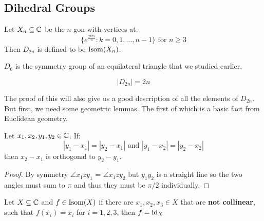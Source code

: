 \documentclass[../main.tex]{subfiles}
\begin{document}
\subsection{Dihedral Groups}
\begin{definition}
  Let $X_n \subseteq \mathbb{C}$ be the $n$-gon with vertices at:
  \[
    \{e^{\frac{2k\pi i}{n}}: k = 0, 1, \ldots, n-1\} \text{ for } n \geq3
  \]
  Then $D_{2n}$ is defined to be $\operatorname{Isom}(X_n)$.
\end{definition}
\begin{example}
  $D_6$ is the symmetry group of an equilateral triangle that we studied earlier.
\end{example}
\begin{theorem}
  \[
    |D_{2n}| = 2n
  \]
\end{theorem}
The proof of this will also give us a good description of all the elements of $D_{2n}$.
But first, we need some geometric lemmas.
The first of which is a basic fact from Euclidean geometry.
\begin{lemma}
  Let $x_1, x_2, y_1, y_2 \in \mathbb{C}$. If:
  \[
    |y_1 - x_1| = |y_2 - x_1| \text{ and } |y_1 - x_2| = |y_2 - x_2|
    \label{kiteLemma}
  \]
  then $x_2 - x_1$ is orthogonal to $y_2 - y_1$.
\end{lemma}
\begin{center}
\end{center}
\begin{proof}
  By symmetry $\angle x_1 z y_1$ = $\angle x_1 z y_2$ but $y_1 y_2$ is a straight line so the two angles must sum to $\pi$ and thus they must be $\pi/2$ individually.
\end{proof}
\begin{lemma}
  Let $X \subseteq \mathbb{C}$ and $f \in \operatorname{Isom}(X)$ if there are $x_1, x_2, x_3 \in X$ that are \textbf{not collinear}, such that $f(x_i) = x_i$ for $i = 1, 2, 3$, then $f = \mathrm{id}_X$
\end{lemma}
\end{document}
